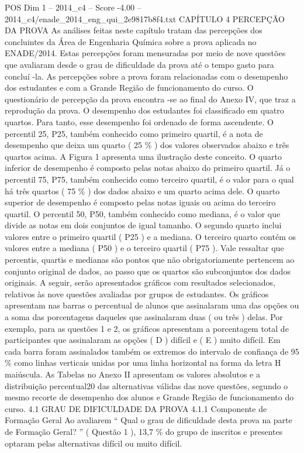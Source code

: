 \begin{textsample}{POS Dim 1 – 2014\_c4 – Score -4.00 – 2014\_c4/enade\_2014\_eng\_qui\_2e9817b8f4.txt}  \label{ex:f1_pos_320}
CAPÍTULO 4 PERCEPÇÃO DA PROVA As análises feitas neste capítulo tratam das percepções dos concluintes da Área de Engenharia Química sobre a prova aplicada no ENADE/2014.
Estas percepções foram mensuradas por meio de nove questões que avaliaram desde o grau de dificuldade da prova até o tempo gasto para concluí -la.
As percepções sobre a prova foram relacionadas com o desempenho dos estudantes e com a Grande Região de funcionamento do curso.
O questionário de percepção da prova encontra -se ao final do Anexo IV, que traz a reprodução da prova.
O desempenho dos estudantes foi classificado em quatro quartos.
Para tanto, esse desempenho foi ordenado de forma ascendente.
O percentil 25, P25, também conhecido como primeiro quartil, é a nota de desempenho que deixa um quarto ( 25 \% ) dos valores observados abaixo e três quartos acima.
A Figura 1 apresenta uma ilustração deste conceito.
O quarto inferior de desempenho é composto pelas notas abaixo do primeiro quartil.
Já o percentil 75, P75, também conhecido como terceiro quartil, é o valor para o qual há três quartos ( 75 \% ) dos dados abaixo e um quarto acima dele.
O quarto superior de desempenho é composto pelas notas iguais ou acima do terceiro quartil.
O percentil 50, P50, também conhecido como mediana, é o valor que divide as notas em dois conjuntos de igual tamanho.
O segundo quarto inclui valores entre o primeiro quartil ( P25 ) e a mediana.
O terceiro quarto contém os valores entre a mediana ( P50 ) e o terceiro quartil ( P75 ).
Vale ressaltar que percentis, quartis e medianas são pontos que não obrigatoriamente pertencem ao conjunto original de dados, ao passo que os quartos são subconjuntos dos dados originais.
A seguir, serão apresentados gráficos com resultados selecionados, relativos às nove questões avaliadas por grupos de estudantes.
Os gráficos apresentam nas barras o percentual de alunos que assinalaram uma das opções ou a soma das porcentagens daqueles que assinalaram duas ( ou três ) delas.
Por exemplo, para as questões 1 e 2, os gráficos apresentam a porcentagem total de participantes que assinalaram as opções ( D ) difícil e ( E ) muito difícil.
Em cada barra foram assinalados também os extremos do intervalo de confiança de 95 \% como linhas verticais unidas por uma linha horizontal na forma da letra H maiúscula.
As Tabelas no Anexo II apresentam os valores absolutos e a distribuição percentual20 das alternativas válidas das nove questões, segundo o mesmo recorte de desempenho dos alunos e Grande Região de funcionamento do curso. 4.1 GRAU DE DIFICULDADE DA PROVA 4.1.1 Componente de Formação Geral Ao avaliarem “ Qual o grau de dificuldade desta prova na parte de Formação Geral? ” ( Questão 1 ), 13,7 \% do grupo de inscritos e presentes optaram pelas alternativas difícil ou muito difícil.

\end{textsample}
